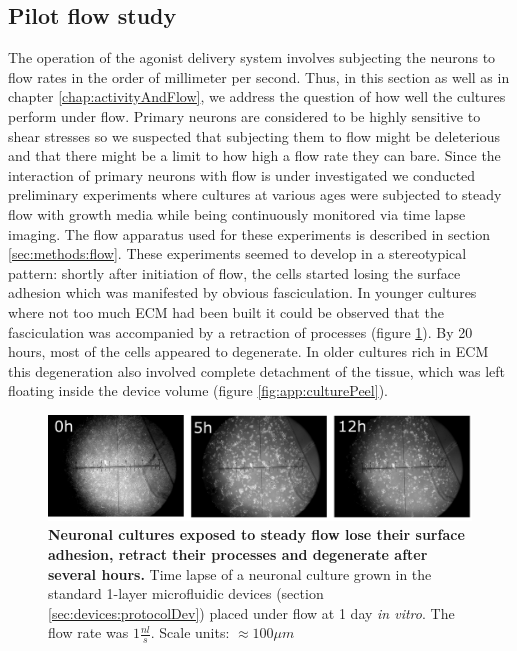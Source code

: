 \subsection{Pilot flow study}
    The operation of the agonist delivery system involves subjecting the neurons to flow rates in the order of millimeter per second. Thus, in this section as well as in chapter \ref{chap:activityAndFlow}, we address the question of how well the cultures perform under flow. Primary neurons are considered to be highly sensitive to shear stresses so we suspected that subjecting them to flow might be deleterious and that there might be a limit to how high a flow rate they can bare. Since the interaction of primary neurons with flow is under investigated we conducted preliminary experiments where cultures at various ages were subjected to steady flow with growth media while being continuously monitored via time lapse imaging. The flow apparatus used for these experiments is described in section \ref{sec:methods:flow}. These experiments seemed to develop in a stereotypical pattern: shortly after initiation of flow, the cells started losing the surface adhesion which was manifested by obvious fasciculation. In younger cultures where not too much ECM had been built it could be observed that the fasciculation was accompanied by a retraction of processes (figure \ref{fig:devices:degeneration}). By 20 hours, most of the cells appeared to degenerate. In older cultures rich in ECM this degeneration also involved complete detachment of the tissue, which was left floating inside the device volume (figure \ref{fig:app:culturePeel}).

    \begin{figure}[h]
            \centering
            \includegraphics[width=15cm]{chapter4/figures/degenerationExample/degenerationExample.jpg}
            \caption[Time lapse of neuronal culture under steady microfluidic flow]{\textbf{Neuronal cultures exposed to steady flow lose their surface adhesion, retract their processes and degenerate after several hours.} Time lapse of a neuronal culture grown in the standard 1-layer microfluidic devices (section \ref{sec:devices:protocolDev}) placed under flow at 1 day \textit{in vitro}. The flow rate was \(1 \frac{nl}{s}\). Scale units: \(\approx100 \mu m\)}
            \label{fig:devices:degeneration}
    \end{figure}


